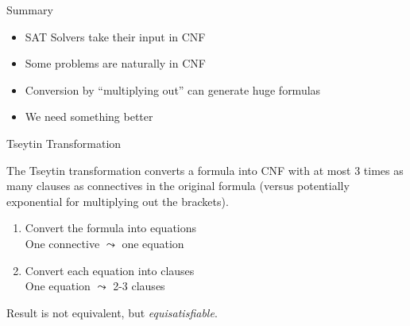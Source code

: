 \documentclass[xetex,aspectratio=169,14pt,hyperref={pdfpagelabels=true,pdflang={en-GB}}]{beamer}
\begin{document}
\begin{frame}
  {Summary}

  \begin{itemize}
  \item SAT Solvers take their input in CNF
  \item Some problems are naturally in CNF
  \item Conversion by ``multiplying out'' can generate huge formulas
  \item We need something better
  \end{itemize}
\end{frame}


\begin{frame}
  {Tseytin Transformation}

  The Tseytin transformation converts a formula into CNF with at most
  3 times as many clauses as connectives in the original formula
  (versus potentially exponential for multiplying out the brackets).

  \bigskip

  \begin{enumerate}
  \item Convert the formula into equations \\
    \quad \textcolor{black!60}{One connective $\leadsto$ one equation}
  \item Convert each equation into clauses \\
    \quad \textcolor{black!60}{One equation $\leadsto$ 2-3 clauses}
  \end{enumerate}

  \bigskip

  Result is not equivalent, but \emph{equisatisfiable}.





\end{frame}
\end{document}
